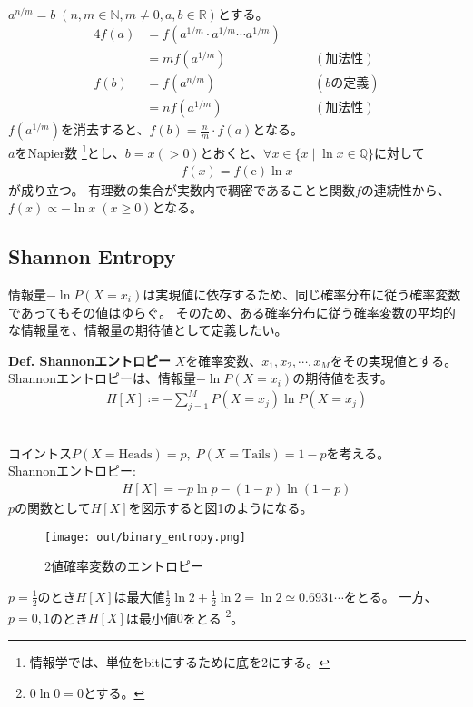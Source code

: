 \documentclass[a4paper,11pt]{jsarticle}
\begin{document}
\\
$a^{n/m} = b \; (n, m \in \mathbb{N}, m \neq 0, a, b \in \mathbb{R})$とする。
\begin{alignat*}{4}
  f(a) &= f(a^{1/m} \cdot a^{1/m} \cdots a^{1/m}) \\
  &= m f(a^{1/m}) && \quad (\text{加法性}) \\
  f(b) &= f(a^{n/m}) && \quad (\text{$b$の定義}) \\
  &= n f(a^{1/m}) && \quad (\text{加法性})
\end{alignat*}
$f(a^{1/m})$を消去すると、$f(b)=\frac{n}{m} \cdot f(a)$となる。\\
$a$をNapier数 \footnote{情報学では、単位をbitにするために底を2にする。}とし、$b=x(>0)$とおくと、$\forall x \in \{ x \mid \ln{x} \in \mathbb{Q} \}$に対して
\begin{align}
  f(x) = f(\mathrm{e}) \ln{x}
\end{align}
が成り立つ。
有理数の集合が実数内で稠密であることと関数$f$の連続性から、\\
$f(x) \propto - \ln{x} \; (x \geq 0)$となる。\\

\subsection{Shannon Entropy}

情報量$-\ln{P(X=x_i)}$は実現値に依存するため、同じ確率分布に従う確率変数であってもその値はゆらぐ。
そのため、ある確率分布に従う確率変数の平均的な情報量を、情報量の期待値として定義したい。
\begin{itembox}[l]{\textbf{Def. Shannonエントロピー}}
$X$を確率変数、$x_1, x_2, \cdots, x_M$をその実現値とする。
Shannonエントロピーは、情報量$-\ln{P(X=x_i)}$の期待値を表す。
  \begin{align}
    H[X] \coloneq - \sum_{j=1}^M P(X=x_j) \ln{P(X=x_j)}
  \end{align}
\end{itembox}

\smallskip

\\
コイントス$P(X=\mathrm{Heads})=p, \; P(X=\mathrm{Tails})=1-p$を考える。\\
Shannonエントロピー:
\begin{align}
  H[X] = - p \ln{p} - (1-p) \ln{(1-p)}
\end{align}
$p$の関数として$H[X]$を図示すると図1のようになる。
\begin{figure}[H]
  \centering
  \texttt{[image: out/binary\_entropy.png]}
  \caption{2値確率変数のエントロピー} \label{binaryentropy}
\end{figure}
$p=\frac{1}{2}$のとき$H[X]$は最大値$\frac{1}{2} \ln{2} + \frac{1}{2} \ln{2} = \ln{2} \simeq 0.6931 \cdots$をとる。
一方、$p=0, 1$のとき$H[X]$は最小値$0$をとる \footnote{$0\ln{0}=0$とする。}。
\end{document}
